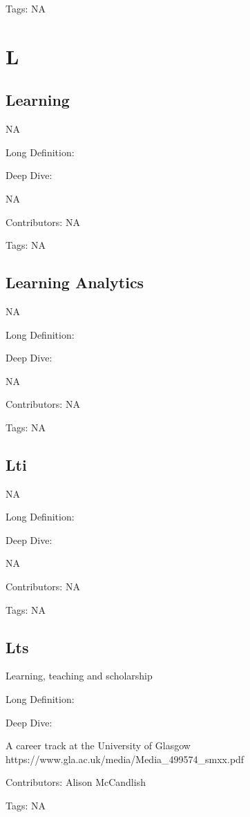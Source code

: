 \documentclass[
  letterpaper,
  DIV=11,
  numbers=noendperiod]{scrreprt}
\begin{document}
Tags: NA


\chapter{L}\label{l}

\section{Learning}\label{learning}

NA

Long Definition:

Deep Dive:

NA

Contributors: NA

Tags: NA

\section{Learning Analytics}\label{learning-analytics}

NA

Long Definition:

Deep Dive:

NA

Contributors: NA

Tags: NA

\section{Lti}\label{lti}

NA

Long Definition:

Deep Dive:

NA

Contributors: NA

Tags: NA

\section{Lts}\label{lts}

Learning, teaching and scholarship

Long Definition:

Deep Dive:

A career track at the University of Glasgow
https://www.gla.ac.uk/media/Media\_499574\_smxx.pdf

Contributors: Alison McCandlish

Tags: NA
\end{document}
